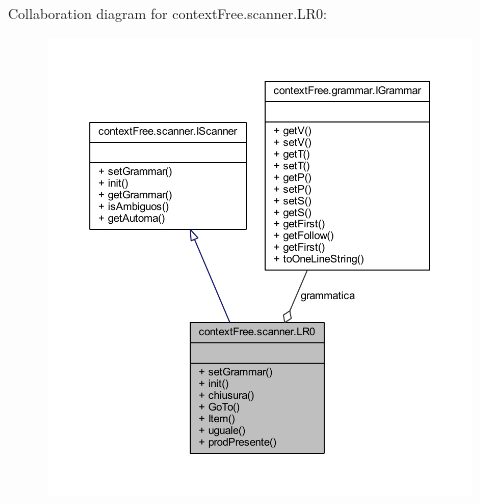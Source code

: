 Collaboration diagram for context\-Free.\-scanner.\-L\-R0\-:\nopagebreak
\begin{figure}[H]
\begin{center}
\leavevmode
\includegraphics[width=350pt]{classcontext_free_1_1scanner_1_1_l_r0__coll__graph}
\end{center}
\end{figure}
